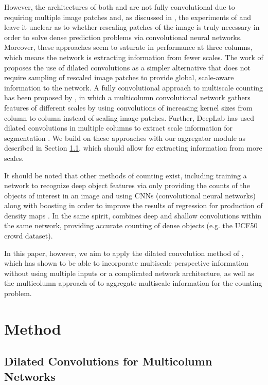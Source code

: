 \documentclass[10pt,twocolumn,letterpaper]{article}
\begin{document}
However, the architectures of both \cite{rubio2016} and \cite{zhang2015cross} are not fully convolutional due to requiring multiple image patches and, as discussed in \cite{yu2015}, the experiments of \cite{noh2015, fischer2015} and \cite{farabet2013, lin2016, chen2016} leave it unclear as to whether rescaling patches of the image is truly necessary in order to solve dense prediction problems via convolutional neural networks. Moreover, these approaches seem to saturate in performance at three columns, which means the network is extracting information from fewer scales. The work of \cite{yu2015} proposes the use of dilated convolutions as a simpler alternative that does not require sampling of rescaled image patches to provide global, scale-aware information to the network. A fully convolutional approach to multiscale counting has been proposed by \cite{zhang2016single}, in which a multicolumn convolutional network gathers features of different scales by using convolutions of increasing kernel sizes from column to column instead of scaling image patches. Further, DeepLab has used dilated convolutions in multiple columns to extract scale information for segmentation \cite{chen2017deeplab}. We build on these approaches with our aggregator module as described in Section \ref{sec:method}, which should allow for extracting information from more scales.

It should be noted that other methods of counting exist, including training a network to recognize deep object features via only providing the counts of the objects of interest in an image \cite{segui2015} and using CNNs (convolutional neural networks) along with boosting in order to improve the results of regression for production of density maps \cite{walach2016}. In the same spirit, \cite{boominathan2016} combines deep and shallow convolutions within the same network, providing accurate counting of dense objects (e.g. the UCF50 crowd dataset).

In this paper, however, we aim to apply the dilated convolution method of \cite{yu2015}, which has shown to be able to incorporate multiscale perspective information without using multiple inputs or a complicated network architecture, as well as the multicolumn approach of \cite{zhang2016single, chen2017deeplab} to aggregate multiscale information for the counting problem.

\section{Method}
\subsection{Dilated Convolutions for Multicolumn Networks}\label{sec:method}
\end{document}
